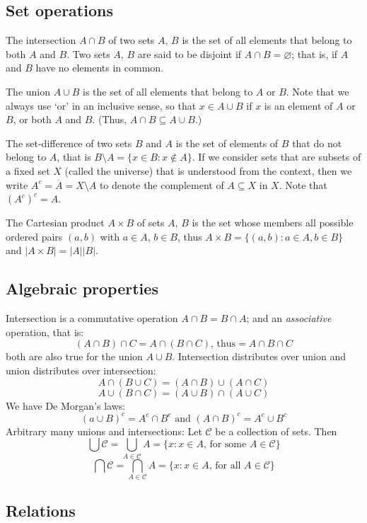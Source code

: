 \documentclass{article}
\begin{document}
\subsection{Set operations}

The intersection $A\cap B$ of two sets $A$, $B$ is the set of all elements that belong to both $A$ and $B$. Two sets $A$, $B$ are said to be disjoint if $A\cap B = \varnothing $; that is, if $A$ and $B$ have no elements in common.

The union $A \cup B$ is the set of all elements that belong to $A$ or $B$. Note that we always use ‘or’ in an inclusive sense, so that $x \in A \cup B$ if $x$ is an element of $A$ or $B$, or both $A$ and $B$. (Thus, $A \cap B \subseteq A \cup B$.)

The set-difference of two sets $B$ and $A$ is the set of elements of $B$ that do not belong to $A$, that is $B \setminus A = \{x \in B:x \notin A\}$.
If we consider sets that are subsets of a fixed set $X$ (called the universe) that is understood from the context, then we write $A^c = \overline{A} = X \setminus A$ to denote the complement of $A \subseteq X$ in $X$. Note that $(A^c)^c = A$.

The Cartesian product $A \times B$ of sets $A$, $B$ is the set whose members all possible ordered pairs $(a, b)$ with $a\in A$, $b\in B$, thus $A\times B = \{(a,b):a\in A, b\in B \}$ and $|A\times B| = |A||B|$.

\subsection{Algebraic properties}

Intersection is a commutative operation $A\cap B = B \cap A$; and an \textit{associative} operation, that is:
\[
(A\cap B)\cap C = A \cap (B\cap C)\text{, thus} = A\cap B \cap C
\]
   both are also true for the union $A\cup B$.
Intersection distributes over union and union distributes over intersection:
\[
A\cap (B\cup C) = (A\cap B)\cup (A\cap C)
\]
\[
A\cup (B\cap C) = (A\cup B) \cap (A\cup C)
\]
We have De Morgan’s laws:
\[
(a\cup B)^c = A^c\cap B^c \text{ and } (A\cap B)^c = A^c\cup B^c
\]
Arbitrary many unions and intersections: Let $\mathcal{C}$ be a collection of sets. Then
\[
\bigcup\mathcal{C} = \bigcup_{A\in  \mathcal{C}}A = \{x: x \in A\text{, for some } A \in \mathcal{C}\}
\]
\[
\bigcap\mathcal{C} = \bigcap_{A\in  \mathcal{C}}A = \{x: x \in A\text{, for all } A \in \mathcal{C}\}
\]

\subsection{Relations}
\end{document}
